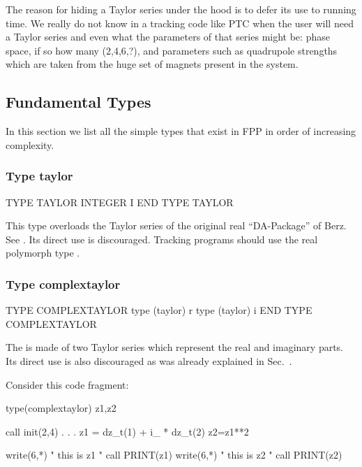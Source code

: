\documentclass[english,12pt,article]{article} %
\begin{document}
The reason for hiding a Taylor series under the hood is to defer its use to running time. We really do not know in a tracking code like PTC when the user will need a Taylor series and even what the parameters of that series might be: phase space, if so how many (2,4,6,?), and parameters such as quadrupole strengths which are taken from the huge set of magnets present in the system.


\subsection{Fundamental Types}\label{sec:funtype}

In this section we list all the simple types that exist in FPP in order of increasing complexity.

\subsubsection{Type taylor}

\begin{example}
  TYPE TAYLOR
     INTEGER I   
  END TYPE TAYLOR
\end{example}

This type overloads the Taylor series of the original real ``DA-Package'' of Berz. See . Its direct use is discouraged. Tracking programs should use the real polymorph type .

\subsubsection{Type complextaylor}\label{sec:complextaylor}

\begin{example}
  TYPE COMPLEXTAYLOR
     type (taylor) r
     type (taylor) i
  END TYPE COMPLEXTAYLOR
\end{example}
The  is made of two Taylor series which represent the real and imaginary parts. Its direct use is also discouraged as was already explained in Sec.~.

Consider this code fragment:
\begin{code}
   type(complextaylor) z1,z2
 
   call init(2,4)
   .
   .
   .
   z1 = dz_t(1) + i_ * dz_t(2)
   z2=z1**2
   
   write(6,*) " this is z1 "
   call PRINT(z1)   
   write(6,*) " this is z2 "
   call PRINT(z2)
\end{code}
\end{document}
